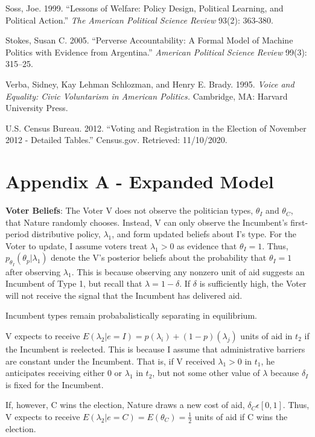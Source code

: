 \documentclass[12pt]{paper}
\begin{document}
\begin{hangparas}{.25in}{1}
Soss, Joe. 1999. “Lessons of Welfare: Policy Design, Political Learning, and Political Action.” \textit{The American Political Science Review} 93(2): 363-380.

Stokes, Susan C. 2005. “Perverse Accountability: A Formal Model of Machine Politics with Evidence from Argentina.” \textit{American Political Science Review } 99(3): 315–25.


Verba, Sidney, Kay Lehman Schlozman, and Henry E. Brady. 1995. \textit{Voice and Equality: Civic Voluntarism in American Politics.} Cambridge, MA: Harvard University Press.

U.S. Census Bureau. 2012. “Voting and Registration in the Election of November 2012 - Detailed Tables.” Census.gov. Retrieved: 11/10/2020.
\end{hangparas}
\clearpage


\section*{Appendix A - Expanded Model}
\textbf{Voter Beliefs}: The Voter V does not observe the politician types, $\theta_I$ and $\theta_C$, that Nature randomly chooses. Instead, V can only observe the Incumbent's first-period distributive policy,  $\lambda_1$, and form updated beliefs about I’s type.  For the Voter to update, I assume voters treat $\lambda_1 > 0$ as evidence that $\theta_I = 1$. Thus, $p_{\theta_I} (\theta_p | \lambda_1 )$ denote the V’s posterior beliefs about the probability that $\theta_I = 1$ after observing $\lambda_1$. This is because observing any nonzero unit of aid suggests an Incumbent of Type 1, but recall that $\lambda = 1 - \delta$. If $\delta$ is sufficiently high, the Voter will not receive the signal that the Incumbent has delivered aid.

Incumbent types remain probabalistically separating in equilibrium.

V expects to receive $E(\lambda_2 | e=I) = p(\lambda_i) + (1-p)(\lambda_j)$ units of aid in $t_2$ if the Incumbent is reelected. This is because I assume that administrative barriers are constant under the Incumbent. That is, if V received $\lambda_1 > 0$ in $t_1$, he anticipates receiving either $0$ or $\lambda_1$ in $t_2$, but not some other value of $\lambda$ because $\delta_I$ is fixed for the Incumbent.

If, however, C wins the election, Nature draws a new cost of aid, $\delta_C \epsilon [0,1]$. Thus, V expects to receive $E(\lambda_2 | e=C) = E(\theta_C) = \frac{1}{2}$ units of aid if C wins the election.
\end{document}
